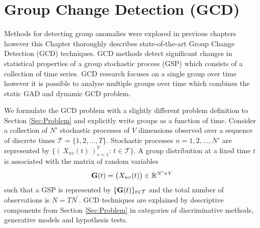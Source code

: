 \chapter{ Group Change Detection (GCD) } 
 \label{sec:dynamicGCD}
Methods for detecting group anomalies were  explored in previous chapters however this Chapter thoroughly describes state-of-the-art Group Change Detection (GCD) techniques.   GCD methods detect  significant changes in statistical properties of a group stochastic process (GSP) which consists of a collection of time series.   
 GCD research focuses on a single group over time however it is possible to analyse multiple groups over time which combines the static GAD and dynamic GCD  problem. 
 
 
We formulate  the GCD problem with a slightly different problem definition to Section \ref{Sec:Problem} and  explicitly write groups as a function of time. %
  Consider a collection of $N'$ stochastic processes  of $V$ dimensions observed over a sequence of discrete times  $\mathcal{T}=\{1,2,\dots,T\}$.  Stochastic processes $n= 1,2,\dots,N'$ are represented by $   \{ (\,{ X}_{nv}(t) \,)_{v=1}^V  : \, t \in \mathcal{T}  \}$.  
A group distribution at a fixed time $t$ is associated with the matrix of random variables 
\begin{align}
{\bf G}(t)=\big( { X}_{nv}(t)\big)  \in \mathbb{R}^{N' \times V} \label{Gdist}
\end{align}
such that  a GSP  is represented by $\{ {{\bf G}}(t) \}_{t \in\mathcal{T}}$  
and the total number of observations is $N= T N^{'} $.    
  GCD techniques  are explained  by descriptive components from Section \ref{Sec:Problem}  in  categories of discriminative methods, generative models and hypothesis tests. 




